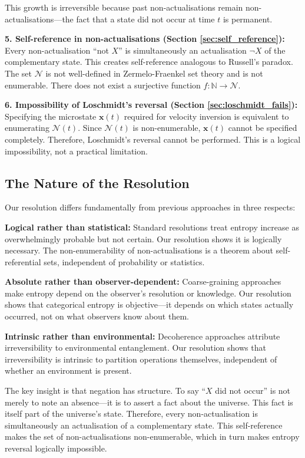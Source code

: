 \documentclass[twocolumn,10pt]{article}
\theoremstyle{definition}
\theoremstyle{remark}
\begin{document}
This growth is irreversible because past non-actualisations remain non-actualisations—the fact that a state did not occur at time $t$ is permanent.

\textbf{5. Self-reference in non-actualisations (Section \ref{sec:self_reference}):} Every non-actualisation ``not $X$'' is simultaneously an actualisation $\neg X$ of the complementary state. This creates self-reference analogous to Russell's paradox. The set $\mathcal{N}$ is not well-defined in Zermelo-Fraenkel set theory and is not enumerable. There does not exist a surjective function $f : \mathbb{N} \to \mathcal{N}$.

\textbf{6. Impossibility of Loschmidt's reversal (Section \ref{sec:loschmidt_fails}):} Specifying the microstate $\mathbf{x}(t)$ required for velocity inversion is equivalent to enumerating $\mathcal{N}(t)$. Since $\mathcal{N}(t)$ is non-enumerable, $\mathbf{x}(t)$ cannot be specified completely. Therefore, Loschmidt's reversal cannot be performed. This is a logical impossibility, not a practical limitation.

\subsection{The Nature of the Resolution}

Our resolution differs fundamentally from previous approaches in three respects:

\textbf{Logical rather than statistical:} Standard resolutions treat entropy increase as overwhelmingly probable but not certain. Our resolution shows it is logically necessary. The non-enumerability of non-actualisations is a theorem about self-referential sets, independent of probability or statistics.

\textbf{Absolute rather than observer-dependent:} Coarse-graining approaches make entropy depend on the observer's resolution or knowledge. Our resolution shows that categorical entropy is objective—it depends on which states actually occurred, not on what observers know about them.

\textbf{Intrinsic rather than environmental:} Decoherence approaches attribute irreversibility to environmental entanglement. Our resolution shows that irreversibility is intrinsic to partition operations themselves, independent of whether an environment is present.

The key insight is that negation has structure. To say ``$X$ did not occur'' is not merely to note an absence—it is to assert a fact about the universe. This fact is itself part of the universe's state. Therefore, every non-actualisation is simultaneously an actualisation of a complementary state. This self-reference makes the set of non-actualisations non-enumerable, which in turn makes entropy reversal logically impossible.
\end{document}
